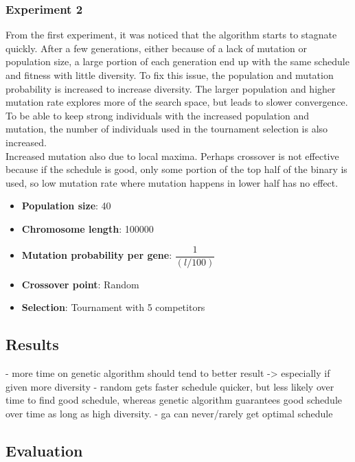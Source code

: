 \documentclass{article}
\newcommand{\n}[0]{\\[\baselineskip]}
\begin{document}
\subsubsection{Experiment 2}
From the first experiment, it was noticed that the algorithm starts to stagnate quickly. After a few generations, either because of a lack of mutation or population size, a large portion of each generation end up with the same schedule and fitness with little diversity. To fix this issue, the population and mutation probability is increased to increase diversity. The larger population and higher mutation rate explores more of the search space, but leads to slower convergence. To be able to keep strong individuals with the increased population and mutation, the number of individuals used in the tournament selection is also increased.
\n
Increased mutation also due to local maxima. Perhaps crossover is not effective because if the schedule is good, only some portion of the top half of the binary is used, so low mutation rate where mutation happens in lower half has no effect.
\begin{itemize}
\item \textbf{Population size}: 40
\item \textbf{Chromosome length}: 100000
\item \textbf{Mutation probability per gene}: $\dfrac{1}{(l/100)}$
\item \textbf{Crossover point}: Random
\item \textbf{Selection}: Tournament with 5 competitors
\end{itemize}

\subsection{Results}

\begin{figure}[H]
\end{figure}


- more time on genetic algorithm should tend to better result -> especially if given more diversity
- random gets faster schedule quicker, but less likely over time to find good schedule, whereas genetic algorithm guarantees good schedule over time as long as high diversity.
- ga can never/rarely get optimal schedule

\subsection{Evaluation}

\printbibliography
\end{document}
